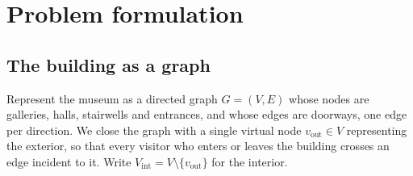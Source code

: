 \documentclass[utf8]{FrontiersinHarvard}
\theoremstyle{plain}
\theoremstyle{definition}
\theoremstyle{remark}
\begin{document}
\section{Problem formulation}
\label{sec:formulation}

\subsection{The building as a graph}

Represent the museum as a directed graph $G=(V,E)$ whose nodes are galleries, halls, stairwells and entrances, and whose edges are doorways, one edge per direction. We close the graph with a single virtual node $v_{\mathrm{out}} \in V$ representing the exterior, so that every visitor who enters or leaves the building crosses an edge incident to it. Write $V_{\mathrm{int}} = V \setminus \{v_{\mathrm{out}}\}$ for the interior.
\end{document}
